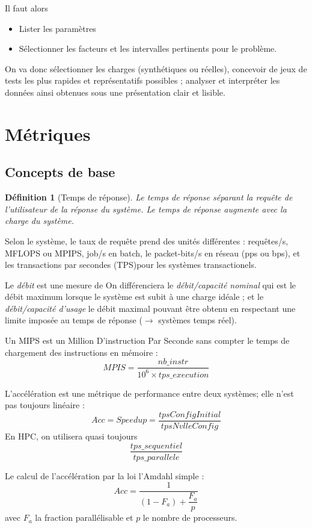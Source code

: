 \documentclass{article}
\newtheorem{defi}{Définition}
\begin{document}
Il faut alors
\begin{itemize}
\item Lister les paramètres
\item Sélectionner les facteurs et les intervalles pertinents pour le problème.
\end{itemize}

On va donc sélectionner les charges (synthétiques ou réelles), concevoir de jeux de tests les plus rapides et représentatifs possibles ; analyser et interpréter les données ainsi obtenues sous une présentation clair et lisible.


\section{Métriques}
\subsection{Concepts de base}

\begin{defi}[Temps de réponse]
Le temps de réponse séparant la requête de l'utilisateur de la réponse du système. Le temps de réponse augmente avec la charge du système.
\end{defi}

Selon le système, le taux de requête prend des unités différentes : requêtes/s, MFLOPS ou MPIPS, job/s en batch, le packet-bits/s en réseau (pps ou bps), et les transactions par secondes (TPS)pour les systèmes transactionels. 

Le \emph{débit} est une mesure de %
On différenciera le \emph{débit/capacité nominal} qui est le débit maximum lorsque le système est subit à une charge idéale ; et le \emph{débit/capacité d'usage} le débit maximal pouvant être obtenu en respectant une limite imposée au temps de réponse ($\to$ systèmes temps réel).

Un MIPS est un Million D'instruction Par Seconde sans compter le temps de chargement des instructions en mémoire :
\[MPIS = \dfrac{nb\_instr}{10^6 \times tps\_execution}\]


L'accélération est une métrique de performance entre deux systèmes; elle n'est pas toujours linéaire :
\[Acc = Speedup = \dfrac{tpsConfigInitial}{tpsNvlleConfig}\]
En HPC, on utilisera quasi toujours 
\[\dfrac{tps\_sequentiel}{tps\_parallele}\]

Le calcul de l'accélération par la loi l'Amdahl simple :
\[Acc = \dfrac{1}{(1-F_a)+\dfrac{F_a}{p}}\]
avec $F_a$ la fraction parallélisable et $p$ le nombre de processeurs.
\end{document}
